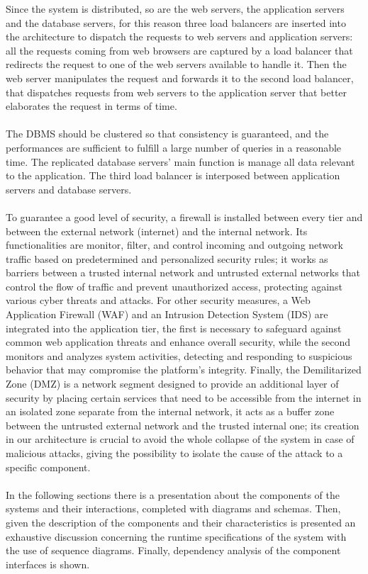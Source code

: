 Since the system is distributed, so are the web servers, the application servers and the database servers, for this reason three load balancers are inserted into the architecture to dispatch the requests to web servers and application servers: all the requests coming from web browsers are captured by a load balancer that redirects the request to one of the web servers available to handle it. Then the web server manipulates the request and forwards it to the second load balancer, that dispatches requests from web servers to the application server that better elaborates the request in terms of time. \\ \\
The DBMS should be clustered so that consistency is guaranteed, and the performances are sufficient to fulfill a large number of queries in a reasonable time. The replicated database servers' main function is manage all data relevant to the application. The third load balancer is interposed between application servers and database servers. \\ \\
To guarantee a good level of security, a firewall is installed between every tier and between the external network (internet) and the internal network. Its functionalities are monitor, filter, and control incoming and outgoing network traffic based on predetermined and personalized security rules; it works as barriers between a trusted internal network and untrusted external networks that control the flow of traffic and prevent unauthorized access, protecting against various cyber threats and attacks. For other security measures, a Web Application Firewall (WAF) and an Intrusion Detection System (IDS) are integrated into the application tier, the first is necessary to safeguard against common web application threats and enhance overall security, while the second monitors and analyzes system activities, detecting and responding to suspicious behavior that may compromise the platform's integrity. Finally, the Demilitarized Zone (DMZ) is a network segment designed to provide an additional layer of security by placing certain services that need to be accessible from the internet in an isolated zone separate from the internal network, it acts as a buffer zone between the untrusted external network and the trusted internal one; its creation in our architecture is crucial to avoid the whole collapse of the system in case of malicious attacks, giving the possibility to isolate the cause of the attack to a specific component.\\ \\
In the following sections there is a presentation about the components of the systems and their interactions, completed with diagrams and schemas. Then, given the description of the components and their characteristics is presented an exhaustive discussion concerning the runtime specifications of the system with the use of sequence diagrams. Finally, dependency analysis of the component interfaces is shown.

